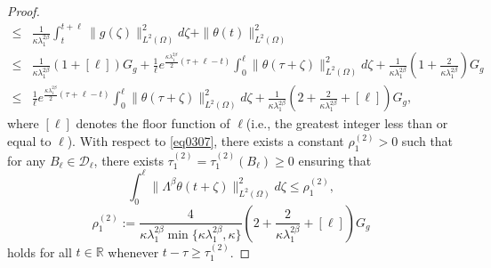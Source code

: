 \documentclass[oneside,preprint,12pt,numbers,sort&compress]{elsarticle}
\begin{document}
\begin{proof}
\begin{equation}
\begin{aligned}
    \leq & \frac{1}{\kappa\lambda_1^{2\beta}} \int_{t}^{t+\ell} \|g(\zeta)\|_{L^2(\Omega)}^2 d\zeta + \|\theta(t)\|_{L^2(\Omega)}^2 \\
    \leq & \frac{1}{\kappa\lambda_1^{2\beta}} \left(1+[\ell]\right)G_g
    + \frac{1}{\ell} e^{\frac{\kappa\lambda_{1}^{2\beta}}{2}(\tau+\ell-t)} \int_{0}^{\ell} \|\theta(\tau+\zeta)\|_{L^2(\Omega)}^2 d\zeta 
    + \frac{1}{\kappa\lambda_{1}^{2\beta}} \left(1+\frac{2}{\kappa\lambda_{1}^{2\beta}}\right)G_g \\
    \leq & \frac{1}{\ell} e^{\frac{\kappa\lambda_{1}^{2\beta}}{2}(\tau+\ell-t)} \int_{0}^{\ell} \|\theta(\tau+\zeta)\|_{L^2(\Omega)}^2 d\zeta 
    + \frac{1}{\kappa\lambda_{1}^{2\beta}} \left(2+\frac{2}{\kappa\lambda_{1}^{2\beta}}+[\ell]\right)G_g,
\end{aligned}
\end{equation}
where $[\ell]$ denotes the floor function of $\ell$(i.e., the greatest integer less than or equal to $\ell$).
With respect to \cref{eq0307}, there exists a constant $\rho_{1}^{(2)} > 0$ such that for any $B_{\ell} \in \mathcal{D}_{\ell}$, there exists $\tau_{1}^{(2)} = \tau_{1}^{(2)}(B_{\ell}) \geq 0$ ensuring that 
\begin{equation}\label{eq0316}
    \int_{0}^{\ell} \| \Lambda^\beta \theta(t+\zeta)\|_{L^2(\Omega)}^2 d\zeta
    \leq 
    \rho_{1}^{(2)},
\end{equation}
\[
   \rho_{1}^{(2)}
   :=
   \frac{4}{\kappa\lambda_{1}^{2\beta}\min\{\kappa\lambda_1^{2\beta},\kappa\}}
   \left(2+\frac{2}{\kappa\lambda_{1}^{2\beta}}+[\ell]\right)G_g
\]
holds for all $t \in \mathbb{R}$ whenever $t - \tau \geq \tau_{1}^{(2)}$.  


\end{proof}
\end{document}
